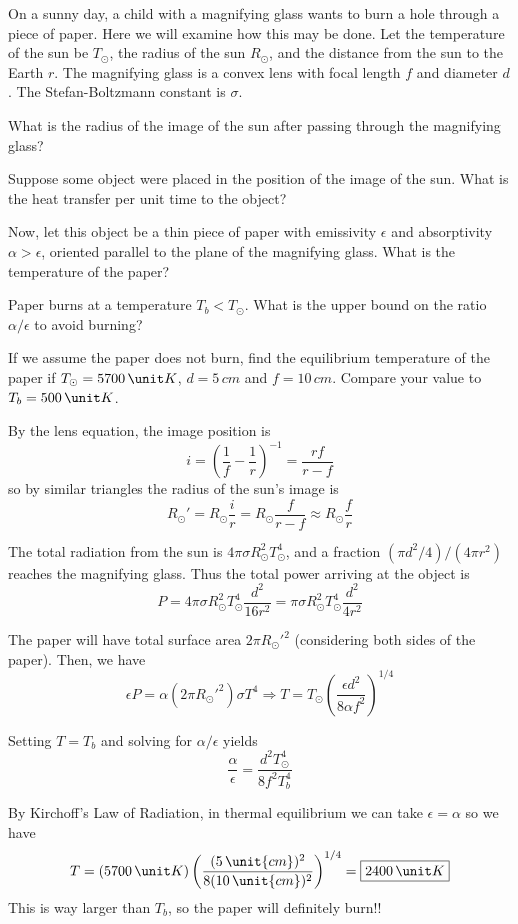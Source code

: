 \documentclass[11pt]{scrartcl}
\begin{document}
\begin{prob}
    On a sunny day, a child with a magnifying glass wants to burn a hole through a piece of paper. Here we will examine how this may be done. Let the temperature of the sun be $T_\odot$, the radius of the sun $R_\odot$, and the distance from the sun to the Earth $r$. The magnifying glass is a convex lens with focal length $f$ and diameter $d$. The Stefan-Boltzmann constant is $\sigma.$
    \begin{anum}
        \item What is the radius of the image of the sun after passing through the magnifying glass? 
        \item Suppose some object were placed in the position of the image of the sun. What is the heat transfer per unit time to the object?
        \item Now, let this object be a thin piece of paper with emissivity $\epsilon$ and absorptivity $\alpha >\epsilon$, oriented parallel to the plane of the magnifying glass. What is the temperature of the paper?
        \item Paper burns at a temperature $T_b<T_\odot$. What is the upper bound on the ratio $\alpha/\epsilon$ to avoid burning?
        \item If we assume the paper does not burn, find the equilibrium temperature of the paper if $T_\odot=5700 \, \unit K$, $d=5\, \unit {cm}$ and $f=10\, \unit{cm}$. Compare your value to $T_b=500\, \unit K$.
    \end{anum}
\end{prob}

\begin{sol}
    \begin{anum}
        \item By the lens equation, the image position is $$i=\left(\frac 1f-\frac1r\right)^{-1}=\frac{rf}{r-f}$$ so by similar triangles the radius of the sun's image is $${R_\odot}'=R_\odot \frac{i}{r}=R_\odot \frac{f}{r-f}\approx \boxed{R_\odot\frac fr}$$
        \item The total radiation from the sun is $4\pi \sigma R_\odot^2T_\odot^4$, and a fraction $(\pi d^2/4)/(4\pi r^2)$ reaches the magnifying glass. Thus the total power arriving at the object is $$P=4\pi \sigma R_\odot^2T_\odot^4\frac{d^2}{16r^2}=\boxed{\pi \sigma R_\odot^2T_\odot^4\frac{d^2}{4r^2}}$$
        \item The paper will have total surface area $2\pi R_\odot'^2$ (considering both sides of the paper). Then, we have $$\epsilon P=\alpha(2\pi R_\odot'^2)\sigma T^4\Rightarrow T=\boxed{T_\odot 
        \left(\frac{\epsilon d^2}{8\alpha f^2}\right)^{1/4}}$$
        \item Setting $T=T_b$ and solving for $\alpha/\epsilon$ yields $$\frac\alpha\epsilon=\boxed{\frac{d^2T_\odot^4}{8f^2T_b^4}}$$
        \item By Kirchoff's Law of Radiation, in thermal equilibrium we can take $\epsilon=\alpha$ so we have $$T=(5700 \, \unit K)\left(\frac{(5\, \unit {cm})^2}{8(10\, \unit {cm})^2}\right)^{1/4}=\boxed{2400\, \unit K}$$This is way larger than $T_b$, so the paper will definitely burn!!
    \end{anum}
\end{sol}
\end{document}
